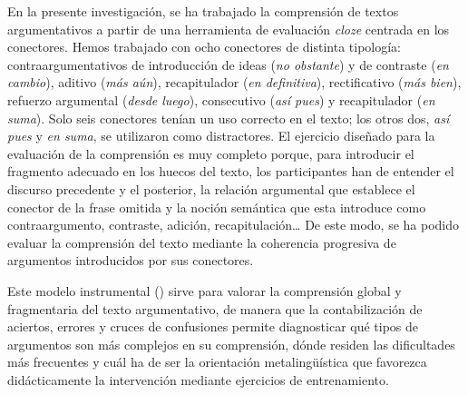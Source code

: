 \documentclass[spanish]{textolivre}
\begin{document}
En la presente investigación, se ha trabajado la comprensión de textos argumentativos a partir de una herramienta de evaluación \emph{cloze} centrada en los conectores. Hemos trabajado con ocho conectores de distinta tipología: contraargumentativos de introducción de ideas (\emph{no obstante}) y de contraste (\emph{en cambio}), aditivo (\emph{más aún}), recapitulador (\emph{en definitiva}), rectificativo (\emph{más bien}), refuerzo argumental (\emph{desde luego}), consecutivo (\emph{así pues}) y recapitulador (\emph{en suma}). Solo seis conectores tenían un uso correcto en el texto; los otros dos, \emph{así pues} y \emph{en suma}, se utilizaron como distractores. El ejercicio diseñado para la evaluación de la comprensión es muy completo porque, para introducir el fragmento adecuado en los huecos del texto, los participantes han de entender el discurso precedente y el posterior, la relación argumental que establece el conector de la frase omitida y la noción semántica que esta introduce como contraargumento, contraste, adición, recapitulación… De este modo, se ha podido evaluar la comprensión del texto mediante la coherencia progresiva de argumentos introducidos por sus conectores.

Este modelo instrumental () sirve para valorar la comprensión global y fragmentaria del texto argumentativo, de manera que la contabilización de aciertos, errores y cruces de confusiones permite diagnosticar qué tipos de argumentos son más complejos en su comprensión, dónde residen las dificultades más frecuentes y cuál ha de ser la orientación metalingüística que favorezca didácticamente la intervención mediante ejercicios de entrenamiento. 
\end{document}
